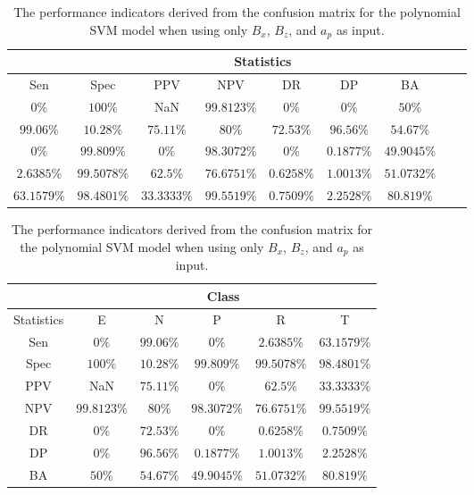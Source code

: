 \begin{table}[!ht]
	\centering
	\begin{tabular}{|c|c|c|c|c|c|c|c|c|}
		\hline
		 & \multicolumn{7}{c|}{Statistics} \\ \hline
		Sen & Spec & PPV & NPV & DR & DP & BA \\ \hline
		$0\%$ & $100\%$ & NaN & $99.8123\%$ & $0\%$ & $0\%$ & $50\%$ \\ \hline
		$99.06\%$ & $10.28\%$ & $75.11\%$ & $80\%$ & $72.53\%$ & $96.56\%$ & $54.67\%$ \\ \hline
		$0\%$ & $99.809\%$ & $0\%$ & $98.3072\%$ & $0\%$ & $0.1877\%$ & $49.9045\%$ \\ \hline
		$2.6385\%$ & $99.5078\%$ & $62.5\%$ & $76.6751\%$ & $0.6258\%$ & $1.0013\%$ & $51.0732\%$ \\ \hline
		$63.1579\%$ & $98.4801\%$ & $33.3333\%$ & $99.5519\%$ & $0.7509\%$ & $2.2528\%$ & $80.819\%$ \\ \hline
	\end{tabular}
	\caption{The performance indicators derived from the confusion matrix for the polynomial SVM model when using only $B_{x}$, $B_{z}$, and $a_{p}$ as input.}
	\label{tab:cs:xzap:svmPoly}
\end{table}

\begin{table}[!ht]
	\centering
	\begin{tabular}{|c|c|c|c|c|c|}
		\hline
		 & \multicolumn{5}{c|}{Class} \\ \hline
		Statistics & E & N & P & R & T \\ \hline
		Sen & $0\%$ & $99.06\%$ & $0\%$ & $2.6385\%$ & $63.1579\%$ \\ \hline
		Spec & $100\%$ & $10.28\%$ & $99.809\%$ & $99.5078\%$ & $98.4801\%$ \\ \hline
		PPV & NaN & $75.11\%$ & $0\%$ & $62.5\%$ & $33.3333\%$ \\ \hline
		NPV & $99.8123\%$ & $80\%$ & $98.3072\%$ & $76.6751\%$ & $99.5519\%$ \\ \hline
		DR & $0\%$ & $72.53\%$ & $0\%$ & $0.6258\%$ & $0.7509\%$ \\ \hline
		DP & $0\%$ & $96.56\%$ & $0.1877\%$ & $1.0013\%$ & $2.2528\%$ \\ \hline
		BA & $50\%$ & $54.67\%$ & $49.9045\%$ & $51.0732\%$ & $80.819\%$ \\ \hline
	\end{tabular}
	\caption{The performance indicators derived from the confusion matrix for the polynomial SVM model when using only $B_{x}$, $B_{z}$, and $a_{p}$ as input.}
	\label{tab:cs:reverse:xzap:svmPoly}
\end{table}


